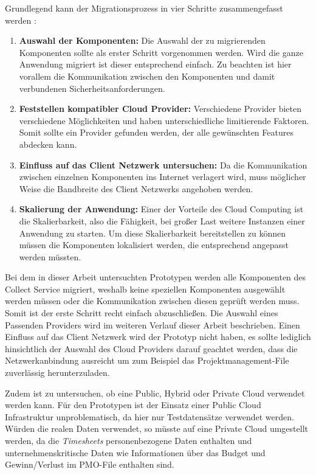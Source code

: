 Grundlegend kann der Migrationsprozess  in vier Schritte zusammengefasst werden \cite[Vgl. auch im Folgenden][S. 34f]{Maenhaut2016}:
\begin{enumerate}
\item \textbf{Auswahl der Komponenten:} Die Auswahl der zu migrierenden Komponenten sollte als erster Schritt vorgenommen werden. Wird die ganze Anwendung migriert ist dieser entsprechend einfach. Zu beachten ist hier vorallem die Kommunikation zwischen den Komponenten und damit verbundenen Sicherheitsanforderungen.
\item \textbf{Feststellen kompatibler Cloud Provider:} Verschiedene Provider bieten verschiedene Möglichkeiten und haben unterschiedliche limitierende Faktoren. Somit sollte ein Provider gefunden werden, der alle gewünschten Features abdecken kann.
\item \textbf{Einfluss auf das Client Netzwerk untersuchen:} Da die Kommunikation zwischen einzelnen Komponenten ins Internet verlagert wird, muss möglicher Weise die Bandbreite des Client Netzwerks angehoben werden.
\item \textbf{Skalierung der Anwendung:} Einer der Vorteile des Cloud Computing ist die Skalierbarkeit, also die Fähigkeit, bei großer Last weitere Instanzen einer Anwendung zu starten. Um diese Skalierbarkeit bereitstellen zu können müssen die Komponenten lokalisiert werden, die entsprechend angepasst werden müssten.
\end{enumerate}


Bei dem in dieser Arbeit untersuchten Prototypen werden alle Komponenten des Collect Service migriert, weshalb keine speziellen Komponenten ausgewählt werden müssen oder die Kommunikation zwischen diesen geprüft werden muss. Somit ist der erste Schritt recht einfach abzuschließen. Die Auswahl eines Passenden Providers wird im weiteren Verlauf dieser Arbeit beschrieben. Einen Einfluss auf das Client Netzwerk wird der Prototyp nicht haben, es sollte lediglich hinsichtlich der Auswahl des Cloud Providers darauf geachtet werden, dass die Netzwerkanbindung ausreicht um zum Beispiel das Projektmanagement-File zuverlässig herunterzuladen. \pagebreak

Zudem ist zu untersuchen, ob eine Public, Hybrid oder Private Cloud verwendet werden kann. Für den Prototypen ist der Einsatz einer Public Cloud Infrastruktur unproblematisch, da hier nur Testdatensätze verwendet werden. Würden die realen Daten verwendet, so müsste auf eine Private Cloud umgestellt werden, da die \textit{\glspl{Timesheet}} personenbezogene Daten enthalten und unternehmenskritische Daten wie Informationen über das Budget und Gewinn/Verlust im PMO-File enthalten sind.

